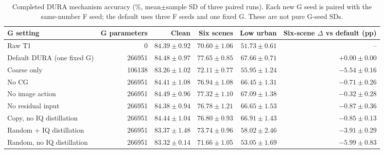 \begin{table}[t]\centering\footnotesize
\caption{Completed DURA mechanism accuracy (\%, mean$\pm$sample SD of three paired runs). Each new G seed is paired with the same-number F seed; the default uses three F seeds and one fixed G. These are not pure G-seed SDs.}
\label{tab:G-ablation-complete}
\begin{tabular}{lrrrrr}\toprule
G setting & G parameters & Clean & Six scenes & Low urban & Six-scene $\Delta$ vs default (pp)\\\midrule
Raw T1 & 0 & $84.39\pm0.92$ & $70.60\pm1.06$ & $51.73\pm0.61$ & --\\
Default DURA (one fixed G) & 266951 & $84.48\pm0.97$ & $77.65\pm0.85$ & $67.66\pm0.71$ & $+0.00\pm0.00$\\
Coarse only & 106138 & $83.26\pm1.02$ & $72.11\pm0.77$ & $55.95\pm1.24$ & $-5.54\pm0.16$\\
No CG & 266951 & $84.41\pm1.08$ & $76.94\pm1.08$ & $66.45\pm1.31$ & $-0.71\pm0.26$\\
No image action & 266951 & $84.49\pm0.96$ & $77.32\pm1.10$ & $67.09\pm1.38$ & $-0.32\pm0.28$\\
No residual input & 266951 & $84.38\pm0.94$ & $76.78\pm1.21$ & $66.65\pm1.53$ & $-0.87\pm0.36$\\
Copy, no IQ distillation & 266951 & $84.44\pm1.04$ & $76.80\pm0.93$ & $66.91\pm1.43$ & $-0.85\pm0.13$\\
Random + IQ distillation & 266951 & $83.37\pm1.48$ & $73.74\pm0.96$ & $58.02\pm2.46$ & $-3.91\pm0.29$\\
Random, no IQ distillation & 266951 & $83.32\pm0.14$ & $71.66\pm1.05$ & $53.05\pm1.69$ & $-5.99\pm0.83$\\
\bottomrule\end{tabular}\end{table}
